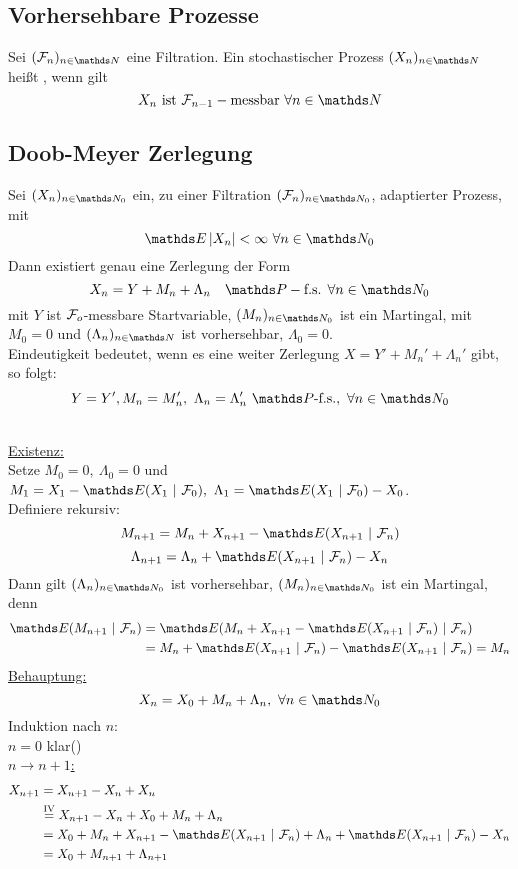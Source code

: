 \subsection{Vorhersehbare Prozesse}
\label{sub:vorher_prozesse}
Sei $(\F_n)_{n\in \N}$ eine Filtration. Ein stochastischer Prozess $(X_n)_{n\in \N}$ heißt , wenn gilt 
\[ 
X_n\text{ ist } \F_{n-1}-\text{messbar }\forall n \in \N
\]

\newpage
\subsection{Doob-Meyer Zerlegung}
\label{sub:doob-meyer}
Sei $(X_n)_{n\in \N_0}$ ein, zu einer Filtration $(\F_n)_{n\in \N_0}$, adaptierter Prozess, mit 
\[
\E\abs{X_n}<\infty~\forall n\in\N_0
\]
Dann existiert genau eine Zerlegung der Form 
\[
X_n= Y + M_n + \Lambda_n \quad \Pw-\text{f.s. }\forall n\in \N_0 
\]
mit $Y$ ist $\mathcal{F}_o$-messbare Startvariable, $(M_n)_{n\in \N_0}$ ist ein Martingal, mit $M_0=0$ und $(\Lambda_n)_{n\in \N}$ ist vorhersehbar, $\Lambda_0=0$.\\
Eindeutigkeit bedeutet, wenn es eine weiter Zerlegung $X=Y'+M_n'+\Lambda_n'$ gibt, so folgt: 
\[
Y=Y',M_n=M_n',~\Lambda_n=\Lambda_n'~\Pw\text{-f.s.},~\forall n\in \N_0  
\]

\\
\uline{Existenz:}\\
Setze $M_0=0,~\Lambda_0=0$ und $M_1=X_1-\E(X_1~|~\F_0),~\Lambda_1=\E(X_1~|~\F_0)-X_0$.\\
Definiere rekursiv:\\
\[ 
M_{n+1}=M_n+X_{n+1}-\E(X_{n+1}~|~\F_n) 
\]
\[
\Lambda_{n+1}=\Lambda_n+\E(X_{n+1}~|~\F_n)-X_n 
\]
Dann gilt $(\Lambda_n)_{n\in \N_0}$ ist vorhersehbar, $(M_n)_{n\in \N_0}$ ist ein Martingal, denn
\begin{equation*}
\begin{aligned}
	\E(M_{n+1}~|~\F_n) &= \E(M_n+X_{n+1}-\E(X_{n+1}~|~\F_n)~|~\F_n)\\
	&= M_n+\E(X_{n+1}~|~\F_n)-\E(X_{n+1}~|~\F_n)=M_n
\end{aligned}
\end{equation*}
\uline{Behauptung:} 
\[
X_n=X_0+M_n+\Lambda_n,~\forall n\in \N_0 
\]
Induktion nach $n$:\\
$n=0$ klar(\checkmark)\\
\uline{$n\to n+1$:}
\begin{equation*}
\begin{aligned}
	X_{n+1} &= X_{n+1}-X_n+X_n\\
	&\stackrel{\text{IV}}{=} X_{n+1}-X_n+X_0+M_n+\Lambda_n\\
	&= X_0+M_n+X_{n+1}-\E(X_{n+1}~|~\F_n)+\Lambda_n+\E(X_{n+1}~|~\F_n)-X_n\\
	&= X_0+M_{n+1}+\Lambda_{n+1}
\end{aligned}
\end{equation*}

